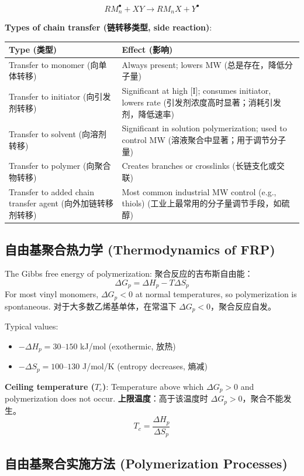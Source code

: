 \documentclass[12pt,a4paper]{ctexart}
\begin{document}
\[
RM_n^\bullet + XY \longrightarrow RM_nX + Y^\bullet
\]

\textbf{Types of chain transfer (链转移类型, side reaction)}:

\begin{longtable}{p{7cm}p{7cm}}
\toprule
\textbf{Type (类型)} & \textbf{Effect (影响)} \\
\midrule
Transfer to monomer (向单体转移) & Always present; lowers MW (总是存在，降低分子量) \\
Transfer to initiator (向引发剂转移) & Significant at high [I]; consumes initiator, lowers rate (引发剂浓度高时显著；消耗引发剂，降低速率) \\
Transfer to solvent (向溶剂转移) & Significant in solution polymerization; used to control MW (溶液聚合中显著；用于调节分子量) \\
Transfer to polymer (向聚合物转移) & Creates branches or crosslinks (长链支化或交联) \\
Transfer to added chain transfer agent (向外加链转移剂转移) & Most common industrial MW control (e.g., thiols) (工业上最常用的分子量调节手段，如硫醇) \\
\bottomrule
\end{longtable}

\subsection{自由基聚合热力学 (Thermodynamics of FRP)}

The Gibbs free energy of polymerization:  
聚合反应的吉布斯自由能：
\[
\Delta G_p = \Delta H_p - T \Delta S_p
\]
For most vinyl monomers, $\Delta G_p < 0$ at normal temperatures, so polymerization is spontaneous.  
对于大多数乙烯基单体，在常温下 $\Delta G_p < 0$，聚合反应自发。

Typical values:
\begin{itemize}
    \item $-\Delta H_p = 30$–$150$ kJ/mol (exothermic, 放热)
    \item $-\Delta S_p = 100$–$130$ J/mol/K (entropy decreases, 熵减)
\end{itemize}

\textbf{Ceiling temperature ($T_c$)}: Temperature above which $\Delta G_p > 0$ and polymerization does not occur.  
\textbf{上限温度}：高于该温度时 $\Delta G_p > 0$，聚合不能发生。
\[
T_c = \frac{\Delta H_p}{\Delta S_p}
\]

\subsection{自由基聚合实施方法 (Polymerization Processes)}
\end{document}
